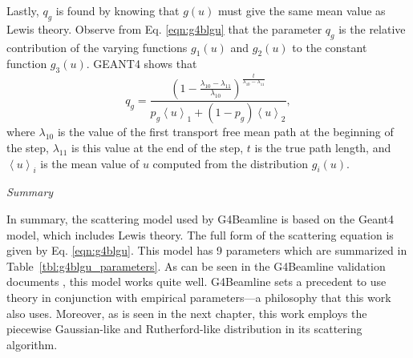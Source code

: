 Lastly, $q_g$ is found by knowing that $g(u)$ must give the same mean value as Lewis theory. Observe from Eq. \eqref{eqn:g4blgu} that the parameter $q_g$ is the relative contribution of the varying functions $g_1(u)$ and $g_2(u)$ to the constant function $g_3(u)$. GEANT4 \cite{geant4} shows that
%
\begin{equation}
q_g=\frac{(1-\frac{\lambda_{10}-\lambda_{11}}{\lambda_{10}})^{\frac{t}{\lambda_{10}-\lambda_{11}}}}{p_g\left<u\right>_1+(1-p_g)\left<u\right>_2},
\label{eqn:geantq}
\end{equation}
where $\lambda_{10}$ is the value of the first transport free mean path at the beginning of the step, $\lambda_{11}$ is this value at the end of the step, $t$ is the true path length, and $\left<u\right>_i$ is the mean value of $u$ computed from the distribution $g_i(u)$.

\noindent \textit{\large{Summary}}

In summary, the scattering model used by G4Beamline is based on the Geant4 model, which includes Lewis theory. The full form of the scattering equation is given by Eq. \eqref{eqn:g4blgu}. This model has 9 parameters which are summarized in Table~\ref{tbl:g4blgu_parameters}. As can be seen in the G4Beamline validation documents \cite{g4bl}, this model works quite well. G4Beamline sets a precedent to use theory in conjunction with empirical parameters---a philosophy that this work also uses. Moreover, as is seen in the next chapter, this work employs the piecewise Gaussian-like and Rutherford-like distribution in its scattering algorithm.
